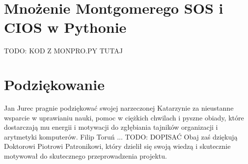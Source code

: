 \documentclass[10pt,journal,compsoc]{IEEEtran}
\begin{document}
\section{Mnożenie Montgomerego SOS i CIOS w Pythonie}
TODO: KOD Z MONPRO.PY TUTAJ


\section*{Podziękowanie}

Jan Jurec pragnie podziękować swojej narzeczonej Katarzynie za nieustanne wsparcie w uprawianiu nauki, pomoc w ciężkich chwilach i pyszne obiady, które dostarczają mu energii i motywacji do zgłębiania tajników organizacji i arytmetyki komputerów.
Filip Toruń ... TODO: DOPISAĆ
Obaj zaś dziękują Doktorowi Piotrowi Patronikowi, który dzielił się swoją wiedzą i skutecznie motywował do skutecznego przeprowadzenia projektu.

\ifCLASSOPTIONcaptionsoff
  \newpage
\fi





%
%
%
\end{document}
